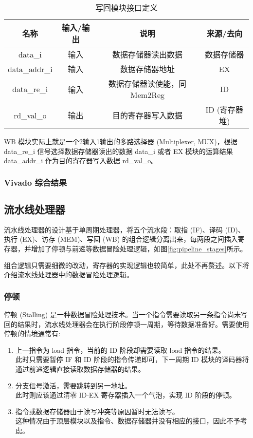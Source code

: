 \documentclass[lang=zh]{sjtuarticle}	%
\begin{document}
\begin{table}[!htp]
	\centering
	\caption{写回模块接口定义}
	\label{tab:single_wb_io}
	\begin{tabular}{|c|c|c|c|}
		\hline
		名称 & 输入/输出 & 说明 & 来源/去向 \\
		\hline
		data\_i & 输入 & 数据存储器读出数据 & 数据存储器 \\
		\hline
		data\_addr\_i & 输入 & 数据存储器地址 & EX \\
		\hline
		data\_re\_i & 输入 & 数据存储器读使能，同Mem2Reg\cite{COD} & ID \\
		\hline
		rd\_val\_o & 输出 & 目的寄存器写入数据 & ID (寄存器堆) \\
		\hline
	\end{tabular}
\end{table}

WB 模块实际上就是一个2输入1输出的多路选择器 (Multiplexer, MUX)，根据 data\_re\_i 信号选择数据存储器读出的数据 data\_i 或者 EX 模块的运算结果 data\_addr\_i 作为目的寄存器写入数据 rd\_val\_o。

\subsubsection{Vivado 综合结果}

\subsection{流水线处理器}

流水线处理器的设计基于单周期处理器，将五个流水段：取指 (IF)、译码 (ID)、执行 (EX)、访存 (MEM)、写回 (WB) 的组合逻辑分离出来，每两段之间插入寄存器，并增加了停顿与前递等数据冒险处理逻辑，如图\ref{fig:pipeline_stages}所示。

组合逻辑只需要细微的改动，寄存器的实现逻辑也较简单，此处不再赘述。以下将介绍流水线处理器中的数据冒险处理逻辑。

\subsubsection{停顿}

停顿 (Stalling) 是一种数据冒险处理技术。当一个指令需要读取另一条指令尚未写回的结果时，流水线处理器会在执行阶段停顿一周期，等待数据准备好。需要使用停顿的情境通常有:

\begin{enumerate}
	\item 上一指令为 load 指令，当前的 ID 阶段却需要读取 load 指令的结果。 \\
	此时只需要暂停 IF 和 ID 阶段的指令传递即可，下一周期 ID 模块的译码器将通过前递逻辑直接读取数据存储器的结果。
	\item 分支信号激活，需要跳转到另一地址。 \\
	此时则应该通过清零 ID-EX 寄存器插入一个气泡，实现 ID 阶段的停顿。
	\item 指令或数据存储器由于读写冲突等原因暂时无法读写。 \\
	这种情况由于顶层模块以及指令、数据存储器并没有相应的接口，因此不予考虑。
\end{enumerate}
\end{document}
